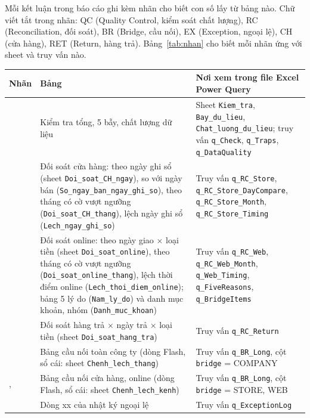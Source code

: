 Mỗi kết luận trong báo cáo ghi kèm nhãn cho biết con số lấy từ bảng nào. Chữ viết tắt trong nhãn: QC (Quality Control, kiểm soát chất lượng), RC (Reconciliation, đối soát), BR (Bridge, cầu nối), EX (Exception, ngoại lệ), CH (cửa hàng), RET (Return, hàng trả). Bảng~\ref{tab:nhan} cho biết mỗi nhãn ứng với sheet và truy vấn nào.

\label{tab:nhan}\nopagebreak[4]
\begin{longtable}{@{}L{3.0cm} L{6.0cm} L{6.0cm}@{}}
\toprule
Nhãn & Bảng & Nơi xem trong file Excel Power Query \\
\midrule
\endhead
{} & Kiểm tra tổng, 5 bẫy, chất lượng dữ liệu & Sheet \texttt{Kiem\_tra}, \texttt{Bay\_du\_lieu}, \texttt{Chat\_luong\_du\_lieu}; truy vấn \texttt{q\_Check}, \texttt{q\_Traps}, \texttt{q\_DataQuality} \\
 & Đối soát cửa hàng: theo ngày ghi sổ (sheet \texttt{Doi\_soat\_CH\_ngay}), so với ngày bán (\texttt{So\_ngay\_ban\_ngay\_ghi\_so}), theo tháng có cờ vượt ngưỡng (\texttt{Doi\_soat\_CH\_thang}), lệch ngày ghi sổ (\texttt{Lech\_ngay\_ghi\_so}) & Truy vấn \texttt{q\_RC\_Store}, \texttt{q\_RC\_Store\_DayCompare}, \texttt{q\_RC\_Store\_Month}, \texttt{q\_RC\_Store\_Timing} \\
 & Đối soát online: theo ngày giao $\times$ loại tiền (sheet \texttt{Doi\_soat\_online}), theo tháng có cờ vượt ngưỡng (\texttt{Doi\_soat\_online\_thang}), lệch thời điểm online (\texttt{Lech\_thoi\_diem\_online}); bảng 5 lý do (\texttt{Nam\_ly\_do}) và danh mục khoản, nhóm (\texttt{Danh\_muc\_khoan}) & Truy vấn \texttt{q\_RC\_Web}, \texttt{q\_RC\_Web\_Month}, \texttt{q\_Web\_Timing}, \texttt{q\_FiveReasons}, \texttt{q\_BridgeItems} \\
 & Đối soát hàng trả $\times$ ngày trả $\times$ loại tiền (sheet \texttt{Doi\_soat\_hang\_tra}) & Truy vấn \texttt{q\_RC\_Return} \\
 & Bảng cầu nối toàn công ty (dòng Flash, sổ cái: sheet \texttt{Chenh\_lech\_thang}) & Truy vấn \texttt{q\_BR\_Long}, cột \texttt{bridge} = COMPANY \\
,\newline {} & Bảng cầu nối cửa hàng, online (dòng Flash, sổ cái: sheet \texttt{Chenh\_lech\_kenh}) & Truy vấn \texttt{q\_BR\_Long}, cột \texttt{bridge} = STORE, WEB \\
 & Dòng xx của nhật ký ngoại lệ & Truy vấn \texttt{q\_ExceptionLog} \\
\bottomrule
\end{longtable}

